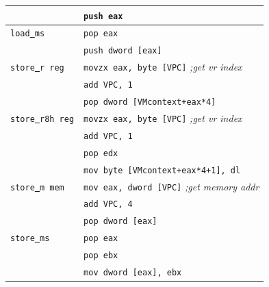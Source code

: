 \begin{table}[]
{\begin{tabular}{|l|l|}
                & \texttt{push eax}                                      \\ \hline
\texttt{load\underline{ }ms}        & \texttt{pop eax}                                       \\
                & \texttt{push dword [eax]}                              \\ \hline
\texttt{store\underline{ }r reg}    & \texttt{movzx eax, byte [VPC]} \emph{;get vr index}     \\
                & \texttt{add VPC, 1}                  \\
                & \texttt{pop dword [VMcontext+eax*4]}                   \\ \hline
\texttt{store\underline{ }r8h reg}  & \texttt{movzx eax, byte [VPC]} \emph{;get vr index}     \\
                & \texttt{add VPC, 1}                  \\
                & \texttt{pop edx}                                       \\
                & \texttt{mov byte [VMcontext+eax*4+1], dl}                \\ \hline
\texttt{store\underline{ }m mem}    & \texttt{mov eax, dword [VPC]} \emph{;get memory addr}               \\
                & \texttt{add VPC, 4}                  \\
                & \texttt{pop dword [eax]}                               \\ \hline
\texttt{store\underline{ }ms}       & \texttt{pop eax}                                       \\
                & \texttt{pop ebx}                                       \\
                & \texttt{mov dword [eax], ebx}                          \\ \hline
\end{tabular}
}
\begin{tabnote}
\end{tabnote}
\end{table}


